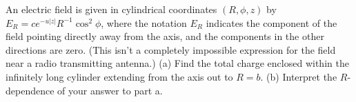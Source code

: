 An electric field is given in cylindrical coordinates $(R,\phi,z)$ by $E_R=ce^{-u|z|}R^{-1}\cos^2\phi$, where
the notation $E_R$ indicates the component of the field pointing directly away from the axis, and
the components in the other directions are zero. (This isn't a completely impossible expression for
the field near a radio transmitting antenna.) (a) Find the total charge enclosed within the
infinitely long cylinder extending from the axis out to $R=b$. (b) Interpret the $R$-dependence of
your answer to part a.
